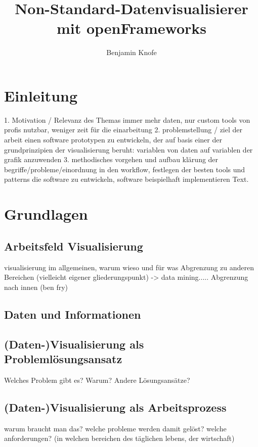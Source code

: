 \documentclass[a4paper, 12pt, onepage, pdftex, headsepline, footsepline]{scrreprt}
\begin{document}
\title{Non-Standard-Datenvisualisierer mit openFrameworks}
\author{Benjamin Knofe}
\subject{Diplomarbeit}
\publishers{Hochschule für Technik, Wirtschaft und Kultur Leipzig}
\dedication{viele nette Leute}
\maketitle
\tableofcontents
\chapter{Einleitung}
\label{sec:testi}

1. Motivation / Relevanz des Themas
immer mehr daten, nur custom tools von profis nutzbar, weniger zeit für die einarbeitung
2. problemstellung / ziel der arbeit
einen software prototypen zu entwickeln, der auf basis einer der grundprinzipien der visualisierung beruht: variablen von daten auf variablen der grafik anzuwenden
3. methodisches vorgehen und aufbau
klärung der begriffe/probleme/einordnung in den workflow, festlegen der besten tools und patterns die software zu entwickeln, software beispielhaft implementieren Text.

\chapter{Grundlagen}
\section{Arbeitsfeld Visualisierung}
visualisierung im allgemeinen, warum wieso und für was
Abgrenzung zu anderen Bereichen (vielleicht eigener gliederungspunkt) -> data mining.....
Abgrenzung nach innen (ben fry)
\section{Daten und Informationen}
\section{(Daten-)Visualisierung als Problemlösungsansatz}
Welches Problem gibt es?
Warum?
Andere Lösungsansätze?
\section{(Daten-)Visualisierung als Arbeitsprozess}
warum braucht man das? welche probleme werden damit gelöst?
welche anforderungen? (in welchen bereichen des täglichen lebens, der wirtschaft)
\end{document}
